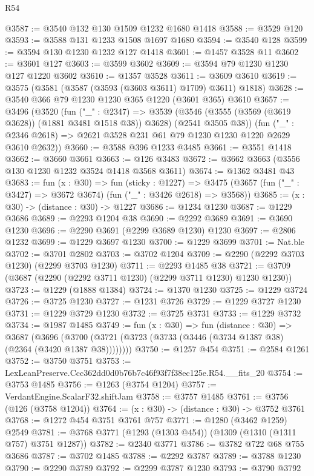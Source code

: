 \begin{lexlean}{R54}
\begin{coremodule}
@3587 := @3540 @132 @130 @1509 @1232 @1680 @1418
@3588 := @3529 @120
@3593 := @3588 @131 @1233 @1508 @1697 @1680
@3594 := @3540 @128
@3599 := @3594 @130 @1230 @1232 @127 @1418
@3601 := @1457 @3528 @11
@3602 := @3601 @127
@3603 := @3599 @3602
@3609 := @3594 @79 @1230 @1230 @127 @1220 @3602
@3610 := @1357 @3528
@3611 := @3609 @3610
@3619 := @3575 (@3581 (@3587 (@3593 (@3603 @3611) @1709) @3611) @1818)
@3628 := @3540 @366 @79 @1230 @1230 @365 @1220 (@3601 @365) @3610
@3657 := @3496
    (@3520
      (fun ("_" : @2347) =>
      @3539 (@3546 (@3555 (@3569 (@3619 @3628)) (@1881 @3481 @1518 @38)) @3628) (@2541 @3505 @38))
      (fun ("_" : @2346 @2618) => @2621 @3528 @231 @61 @79 @1230 @1230 @1220 @2629 @3610 @2632))
@3660 := @3588 @396 @1233 @3485
@3661 := @3551 @1418
@3662 := @3660 @3661
@3663 := @126 @3483
@3672 := @3662 @3663 (@3556 @130 @1230 @1232 @3524 @1418 @3568 @3611)
@3674 := @1362 @3481 @43
@3683 := fun (x : @30) =>
  fun (sticky : @1227) =>
  @3475 (@3657 (fun ("_" : @3427) => @3672 @3674) (fun ("_" : @3426 @2618) => @3568))
@3685 := (x : @30) -> (distance : @30) -> @1227
@3686 := @1234 @1230
@3687 := @1229 @3686
@3689 := @2293 @1204 @38
@3690 := @2292 @3689
@3691 := @3690 @1230
@3696 := @2290 @3691 (@2299 @3689 @1230) @1230
@3697 := @2806 @1232
@3699 := @1229 @3697 @1230
@3700 := @1229 @3699
@3701 := Nat.ble
@3702 := @3701 @2802
@3703 := @3702 @1204
@3709 := @2290 (@2292 @3703 @1230) (@2299 @3703 @1230)
@3711 := @2293 @1485 @38
@3721 := @3709 (@3687 (@2290 (@2292 @3711 @1230) (@2299 @3711 @1230) @1230 @1230))
@3723 := @1229 (@1888 @1384)
@3724 := @1370 @1230
@3725 := @1229 @3724
@3726 := @3725 @1230
@3727 := @1231 @3726
@3729 := @1229 @3727 @1230
@3731 := @1229 @3729 @1230
@3732 := @3725 @3731
@3733 := @1229 @3732
@3734 := @1987 @1485
@3749 := fun (x : @30) =>
  fun (distance : @30) =>
  @3687 (@3696 (@3700 (@3721 (@3723 (@3733 (@3446 (@3734 @1387 @38) (@2364 (@3420 @1387 @38))))))))
@3750 := @1257 @454
@3751 := @2584 @1261
@3752 := @3750 @3751
@3753 := LexLeanPreserve.Ccc362dd0d0b76b7c46f93f7f38ec125e.R54.__fits_20
@3754 := @3753 @1485
@3756 := @1263 (@3754 @1204)
@3757 := VerdantEngine.ScalarF32.shiftJam
@3758 := @3757 @1485
@3761 := @3756 (@126 (@3758 @1204))
@3764 := (x : @30) -> (distance : @30) -> @3752 @3761
@3768 := @1272 @454 @3751 @3761 @757
@3771 := @1280 (@3462 @1259) @2549
@3781 := @3768 @3771 (@1293 (@1303 @454)) (@1309 (@1310 (@1311 @757) @3751 @1287))
@3782 := @2340 @3771
@3786 := @3782 @722 @68 @755 @3686
@3787 := @3702 @1485
@3788 := @2292 @3787
@3789 := @3788 @1230
@3790 := @2290 @3789
@3792 := @2299 @3787 @1230
@3793 := @3790 @3792

\end{coremodule}
\end{lexlean}
